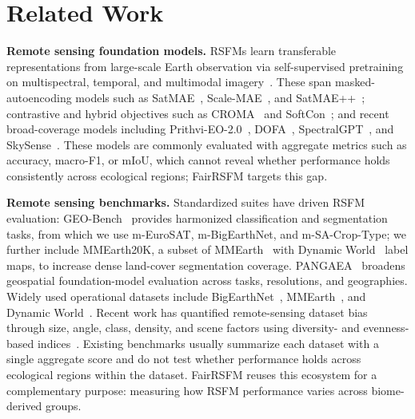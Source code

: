 \documentclass[10pt,twocolumn,letterpaper]{article}
\newcommand{\method}{FairRSFM\xspace}
\begin{document}
\section{Related Work}

\noindent\textbf{Remote sensing foundation models.} RSFMs learn transferable representations from large-scale Earth observation via self-supervised pretraining on multispectral, temporal, and multimodal imagery~\cite{rsfm_survey_multimodal}. These span masked-autoencoding models such as SatMAE~\cite{satmae}, Scale-MAE~\cite{scalemae}, and SatMAE++~\cite{satmaepp}; contrastive and hybrid objectives such as CROMA~\cite{croma} and SoftCon~\cite{softcon}; and recent broad-coverage models including Prithvi-EO-2.0~\cite{prithvi2}, DOFA~\cite{dofa}, SpectralGPT~\cite{spectralgpt}, and SkySense~\cite{skysense}. These models are commonly evaluated with aggregate metrics such as accuracy, macro-F1, or mIoU, which cannot reveal whether performance holds consistently across ecological regions; \method targets this gap.

\smallskip
\noindent\textbf{Remote sensing benchmarks.} Standardized suites have driven RSFM evaluation: GEO-Bench~\cite{geobench} provides harmonized classification and segmentation tasks, from which we use m-EuroSAT, m-BigEarthNet, and m-SA-Crop-Type; we further include MMEarth20K, a subset of MMEarth~\cite{mmearth} with Dynamic World~\cite{dynamicworld} label maps, to increase dense land-cover segmentation coverage. PANGAEA~\cite{pangaea} broadens geospatial foundation-model evaluation across tasks, resolutions, and geographies. Widely used operational datasets include BigEarthNet~\cite{bigearthnet,bigearthnetmm}, MMEarth~\cite{mmearth}, and Dynamic World~\cite{dynamicworld}. Recent work has quantified remote-sensing dataset bias through size, angle, class, density, and scene factors using diversity- and evenness-based indices~\cite{rsd_biaseval}. Existing benchmarks usually summarize each dataset with a single aggregate score and do not test whether performance holds across ecological regions within the dataset. \method reuses this ecosystem for a complementary purpose: measuring how RSFM performance varies across biome-derived groups.
\end{document}
